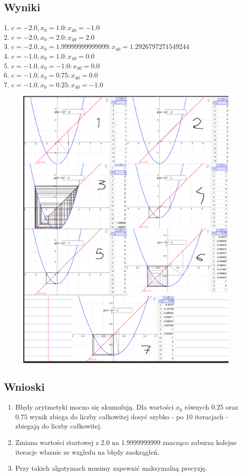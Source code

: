 \documentclass[12pt]{article}
\begin{document}
\subsection{Wyniki}
1. $c = -2.0, x_0 = 1.0 : x_{40} = -1.0$\\
2. $c = -2.0, x_0 = 2.0 : x_{40} = 2.0$\\
3. $c = -2.0, x_0 = 1.99999999999999 : x_{40} = 1.2926797271549244$\\
4. $c = -1.0, x_0 = 1.0 : x_{40} = 0.0$\\
5. $c = -1.0, x_0 = -1.0 : x_{40} = 0.0$\\
6. $c = -1.0, x_0 = 0.75 : x_{40} = 0.0$\\
7. $c = -1.0, x_0 = 0.25 : x_{40} = -1.0$\\
\begin{figure}[htp]
  \centering
  \includegraphics[width=15cm]{opus.png}
\end{figure}    
\subsection{Wnioski}
\begin{enumerate}
  \item Błędy arytmetyki mocno się akumulują. Dla wartości $x_0$ równych $0.25$ oraz $0.75$ wynik
  zbiega do liczby całkowitej dosyć szybko - po 10 iteracjach - zbiegają do liczby całkowitej.
  \item Zmiana wartości startowej z 2.0 na 1.9999999999 znacząco zaburza kolejne iteracje własnie ze wzgledu na błędy zaokrągleń.
  \item Przy takich algotymach musimy zapewnić maksymalną precyzję.
\end{enumerate}
\end{document}

